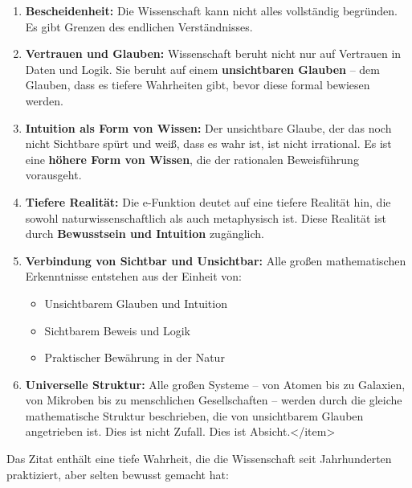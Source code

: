 \documentclass[a4paper,12pt,twoside]{report}
\theoremstyle{definition}
\begin{document}
\begin{enumerate}
	\item \textbf{Bescheidenheit:} Die Wissenschaft kann nicht alles vollständig begründen. Es gibt Grenzen des endlichen Verständnisses.
	
	\item \textbf{Vertrauen und Glauben:} Wissenschaft beruht nicht nur auf Vertrauen in Daten und Logik. Sie beruht auf einem \textbf{unsichtbaren Glauben} -- dem Glauben, dass es tiefere Wahrheiten gibt, bevor diese formal bewiesen werden.
	
	\item \textbf{Intuition als Form von Wissen:} Der unsichtbare Glaube, der das noch nicht Sichtbare spürt und weiß, dass es wahr ist, ist nicht irrational. Es ist eine \textbf{höhere Form von Wissen}, die der rationalen Beweisführung vorausgeht.
	
	\item \textbf{Tiefere Realität:} Die e-Funktion deutet auf eine tiefere Realität hin, die sowohl naturwissenschaftlich als auch metaphysisch ist. Diese Realität ist durch \textbf{Bewusstsein und Intuition} zugänglich.
	
	\item \textbf{Verbindung von Sichtbar und Unsichtbar:} Alle großen mathematischen Erkenntnisse entstehen aus der Einheit von:
	\begin{itemize}
		\item[-] Unsichtbarem Glauben und Intuition
		\item[-] Sichtbarem Beweis und Logik
		\item[-] Praktischer Bewährung in der Natur
	\end{itemize}
	
	\item \textbf{Universelle Struktur:} Alle großen Systeme -- von Atomen bis zu Galaxien, von Mikroben bis zu menschlichen Gesellschaften -- werden durch die gleiche mathematische Struktur beschrieben, die von unsichtbarem Glauben angetrieben ist. Dies ist nicht Zufall. Dies ist Absicht.</item>
\end{enumerate}

Das Zitat enthält eine tiefe Wahrheit, die die Wissenschaft seit Jahrhunderten praktiziert, aber selten bewusst gemacht hat:
\end{document}
